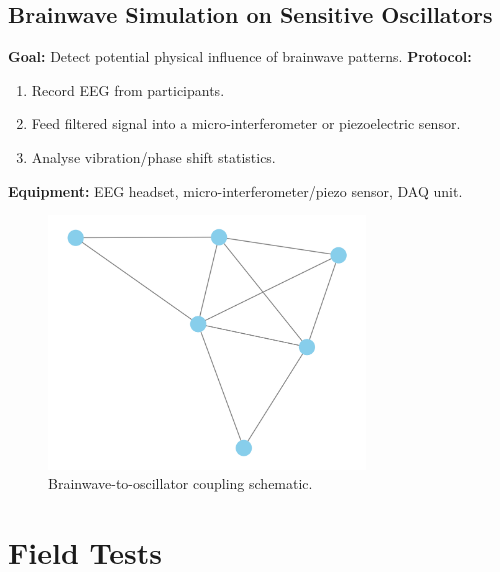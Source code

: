 \documentclass[11pt,a4paper]{article}
\begin{document}
\subsection{Brainwave Simulation on Sensitive Oscillators}
\textbf{Goal:} Detect potential physical influence of brainwave patterns.
\textbf{Protocol:}
\begin{enumerate}
 \item Record EEG from participants.
 \item Feed filtered signal into a micro-interferometer or piezoelectric sensor.
 \item Analyse vibration/phase shift statistics.
\end{enumerate}
\textbf{Equipment:} EEG headset, micro-interferometer/piezo sensor, DAQ unit.
\begin{figure}[h]
    \centering
    \includegraphics[width=0.75\textwidth]{figures/lab2_schematic.png}
    \caption{Brainwave-to-oscillator coupling schematic.}
\end{figure}

\section{Field Tests}
\end{document}
